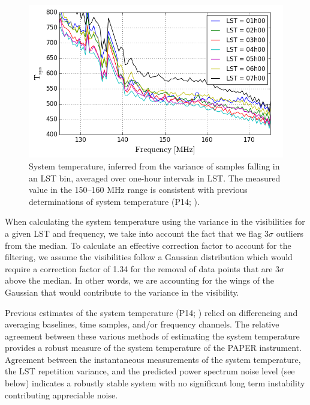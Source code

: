 \documentclass[twocolumn,numberedappendix]{emulateapj} \shorttitle{New Limits on the 21 cm Power Spectrum at $z=8.4$}
\begin{document}
\begin{figure}\centering
\includegraphics[width=\columnwidth]{plots/tsys.png}
\caption{System temperature, inferred from the variance of samples falling 
in an LST bin, averaged over one-hour intervals in LST.  The measured value
in the 150--160 MHz range is consistent with previous determinations of
system temperature (P14; \citealt{jacobs_et_al2014}).
}\label{fig:tsys}
\end{figure}

When calculating the system temperature using the variance in the visibilities
for a given LST and frequency, we take into account the fact that we flag
3$\sigma$ outliers from the median. To calculate an effective correction factor
to account for the filtering, we assume the visibilities follow a Gaussian
distribution which would require a correction factor of 1.34 for the removal of
data points that are 3$\sigma$ above the median. In other words, we are
accounting for the wings of the Gaussian that would contribute to the variance
in the visibility.

Previous estimates
of the system temperature
(P14; \citealt{jacobs_et_al2014}) relied on differencing and averaging
baselines, time samples, and/or frequency channels. The relative agreement
between these various methods of estimating the system temperature provides a
robust measure of the system temperature of the PAPER instrument. Agreement
between the instantaneous measurements of the system temperature, the LST
repetition variance, and the predicted power spectrum noise level (see below)
indicates a robustly stable system with no significant long term instability
contributing appreciable noise.
\end{document}
